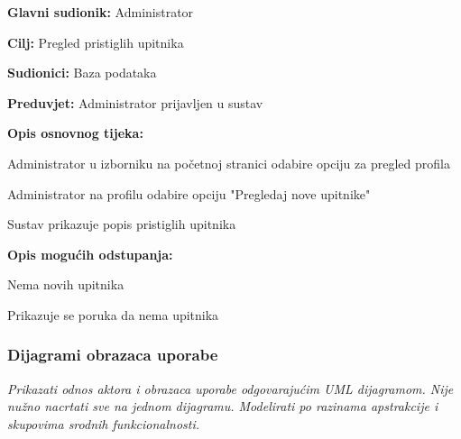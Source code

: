 					\noindent {}
					\begin{packed_item}
	
						\item \textbf{Glavni sudionik:} Administrator
						\item \textbf{Cilj:} Pregled pristiglih upitnika
						\item \textbf{Sudionici:} Baza podataka
						\item \textbf{Preduvjet:} Administrator prijavljen u sustav
						\item \textbf{Opis osnovnog tijeka:}
						
						\item[] \begin{packed_enum}
	
							\item Administrator u izborniku na početnoj stranici odabire opciju za pregled profila
							\item Administrator na profilu odabire opciju "Pregledaj nove upitnike"
							\item Sustav prikazuje popis pristiglih upitnika
							
						\end{packed_enum}
						
						\item  \textbf{Opis mogućih odstupanja:}
						
						\item[] \begin{packed_item}
	
							\item[2.a] Nema novih upitnika
							\item[] \begin{packed_enum}
								
								\item Prikazuje se poruka da nema upitnika
								
							\end{packed_enum}
							
						\end{packed_item}
					\end{packed_item}
				
					
				\subsubsection{Dijagrami obrazaca uporabe}
					
					\textit{Prikazati odnos aktora i obrazaca uporabe odgovarajućim UML dijagramom. Nije nužno nacrtati sve na jednom dijagramu. Modelirati po razinama apstrakcije i skupovima srodnih funkcionalnosti.}
				\eject		
				
